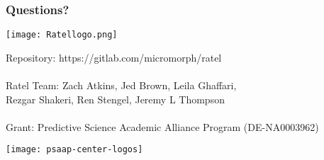 \documentclass{beamer}
\begin{document}

\begin{frame}
\frametitle{Questions?}

\begin{center}
\texttt{[image: Ratellogo.png]}
\end{center}

{\flushleft

Repository: https://gitlab.com/micromorph/ratel\\

~\\

Ratel Team: Zach Atkins, Jed Brown, Leila Ghaffari,\\
\hspace{19mm} Rezgar Shakeri, Ren Stengel, Jeremy L Thompson\\

~\\

Grant: Predictive Science Academic Alliance Program (DE-NA0003962)\\

}

\begin{center}
\texttt{[image: psaap-center-logos]}
\end{center}

\end{frame}

\end{document}
